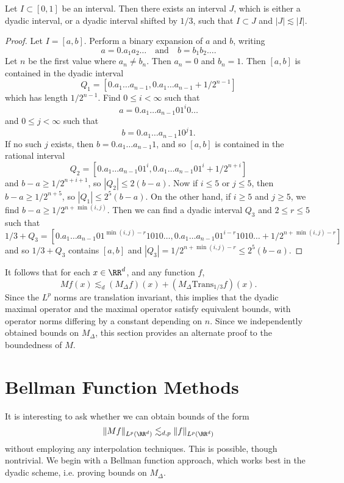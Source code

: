 \begin{lemma}
  Let $I \subset [0,1]$ be an interval. Then there exists an interval $J$, which is either a dyadic interval, or a dyadic interval shifted by $1/3$, such that $I \subset J$ and $|J| \lesssim |I|$.
\end{lemma}
\begin{proof}
  Let $I = [a,b]$. Perform a binary expansion of $a$ and $b$, writing
  \[ a = 0.a_1a_2 \dots \quad\text{and}\quad b = b_1 b_2 \dots. \]
  Let $n$ be the first value where $a_n \neq b_n$. Then $a_n = 0$ and $b_n = 1$. Then $[a,b]$ is contained in the dyadic interval
  \[ Q_1 = \left[ 0.a_1 \dots a_{n-1}, 0.a_1\dots a_{n-1} + 1/2^{n-1} \right] \]
  which has length $1/2^{n-1}$. Find $0 \leq i < \infty$ such that
  \[ a = 0.a_1 \dots a_{n-1} 0 1^i 0 \dots \]
  and $0 \leq j < \infty$ such that
  \[ b = 0.a_1 \dots a_{n-1} 1 0^j 1. \]
  If no such $j$ exists, then $b = 0.a_1 \dots a_{n-1} 1$, and so $[a,b]$ is contained in the rational interval
  \[ Q_2 = \left[ 0.a_1 \dots a_{n-1} 0 1^i, 0.a_1 \dots a_{n-1} 0 1^i + 1/2^{n+i} \right] \]
  and $b - a \geq 1/2^{n+i+1}$, so $|Q_2| \leq 2(b - a)$. Now if $i \leq 5$ or $j \leq 5$, then $b - a \geq 1/2^{n+5}$, so $|Q_1| \leq 2^5(b-a)$. On the other hand, if $i \geq 5$ and $j \geq 5$, we find $b - a \geq 1/2^{n+\min(i,j)}$. Then we can find a dyadic interval $Q_3$ and $2 \leq r \leq 5$ such that
  \[ 1/3 + Q_3 = \left[ 0.a_1 \dots a_{n-1} 0 1^{\min(i,j)-r} 1 0 1 0 \dots, 0.a_1 \dots a_{n-1} 0 1^{i-r} 1 0 1 0 \dots + 1/2^{n+\min(i,j)-r}  \right] \]
  and so $1/3 + Q_3$ contains $[a,b]$ and $|Q_3| = 1/2^{n+\min(i,j)-r} \leq 2^5 (b - a)$.
\end{proof}

It follows that for each $x \in \RR^d$, and any function $f$,
%
\[ Mf(x) \lesssim_d (M_\Delta f)(x) + (M_\Delta \text{Trans}_{1/3} f)(x). \]
%
Since the $L^p$ norms are translation invariant, this implies that the dyadic maximal operator and the maximal operator satisfy equivalent bounds, with operator norms differing by a constant depending on $n$. Since we independently obtained bounds on $M_\Delta$, this section provides an alternate proof to the boundedness of $M$.

\section{Bellman Function Methods}

It is interesting to ask whether we can obtain bounds of the form
%
\[ \| M f \|_{L^p(\RR^d)} \lesssim_{d,p} \| f \|_{L^p(\RR^d)} \]
%
without employing any interpolation techniques. This is possible, though nontrivial. We begin with a Bellman function approach, which works best in the dyadic scheme, i.e. proving bounds on $M_\Delta$.

